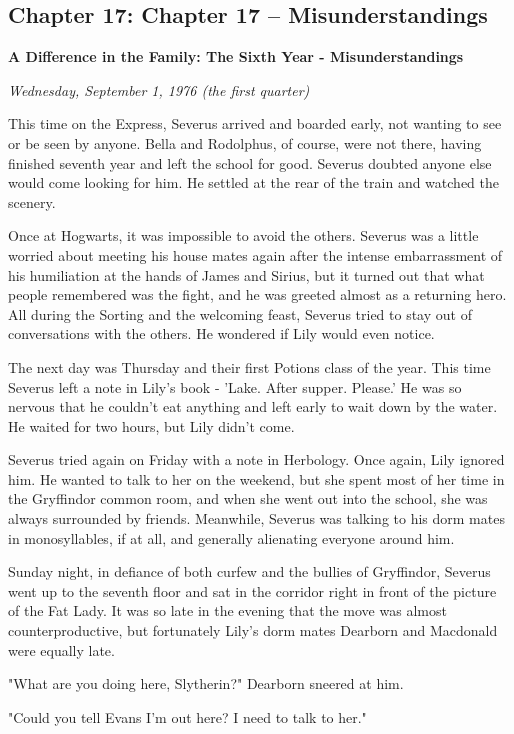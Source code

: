 \documentclass[a4paper,11pt]{article}
\begin{document}
\subsection{Chapter 17: Chapter 17 – Misunderstandings}

\textbf{A Difference in the Family: The Sixth Year - Misunderstandings}

\emph{Wednesday, September 1, 1976 (the first quarter)}

This time on the Express, Severus arrived and boarded early, not wanting to see or be seen by anyone. Bella and Rodolphus, of course, were not there, having finished seventh year and left the school for good. Severus doubted anyone else would come looking for him. He settled at the rear of the train and watched the scenery.

Once at Hogwarts, it was impossible to avoid the others. Severus was a little worried about meeting his house mates again after the intense embarrassment of his humiliation at the hands of James and Sirius, but it turned out that what people remembered was the fight, and he was greeted almost as a returning hero. All during the Sorting and the welcoming feast, Severus tried to stay out of conversations with the others. He wondered if Lily would even notice.

The next day was Thursday and their first Potions class of the year. This time Severus left a note in Lily's book - 'Lake. After supper. Please.' He was so nervous that he couldn't eat anything and left early to wait down by the water. He waited for two hours, but Lily didn't come.

Severus tried again on Friday with a note in Herbology. Once again, Lily ignored him. He wanted to talk to her on the weekend, but she spent most of her time in the Gryffindor common room, and when she went out into the school, she was always surrounded by friends. Meanwhile, Severus was talking to his dorm mates in monosyllables, if at all, and generally alienating everyone around him.

Sunday night, in defiance of both curfew and the bullies of Gryffindor, Severus went up to the seventh floor and sat in the corridor right in front of the picture of the Fat Lady. It was so late in the evening that the move was almost counterproductive, but fortunately Lily's dorm mates Dearborn and Macdonald were equally late.

"What are you doing here, Slytherin?" Dearborn sneered at him.

"Could you tell Evans I'm out here? I need to talk to her."
\end{document}
